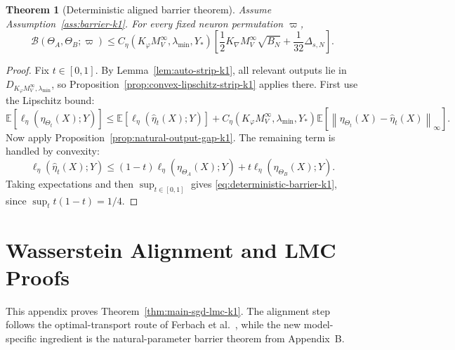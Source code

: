 \documentclass[11pt]{article}
\newtheorem{theorem}{Theorem}
\theoremstyle{definition}
\newcommand{\E}{\mathbb{E}}
\newcommand{\norm}[1]{\left\lVert #1 \right\rVert}
\newcommand{\cB}{\mathcal{B}}
\begin{document}
\begin{theorem}[Deterministic aligned barrier theorem]
\label{thm:deterministic-lmc-k1}
Assume Assumption~\ref{ass:barrier-k1}. For every fixed neuron permutation
$\varpi$,
\begin{equation}
  \cB(\Theta_A,\Theta_B;\varpi)
  \le
  C_\eta(K_\varphi M_V^\infty,\lambda_{\min},Y_\ast)
  \left[
    \frac12 K_{\nabla}M_V^\infty\sqrt{B_N}
    +
    \frac1{32}\Delta_{s,N}
  \right].
  \label{eq:deterministic-barrier-k1}
\end{equation}
\end{theorem}

\begin{proof}
Fix $t\in[0,1]$. By Lemma~\ref{lem:auto-strip-k1}, all relevant outputs lie in
$D_{K_\varphi M_V^\infty,\lambda_{\min}}$, so
Proposition~\ref{prop:convex-lipschitz-strip-k1} applies there. First use the
Lipschitz bound:
\[
  \E[\ell_\eta(\eta_{\Theta_t}(X);Y)]
  \le
  \E[\ell_\eta(\hat\eta_t(X);Y)]
  +
  C_\eta(K_\varphi M_V^\infty,\lambda_{\min},Y_\ast)
  \E[\norm{\eta_{\Theta_t}(X)-\hat\eta_t(X)}_\infty].
\]
Now apply Proposition~\ref{prop:natural-output-gap-k1}. The remaining term is
handled by convexity:
\[
  \ell_\eta(\hat\eta_t(X);Y)
  \le
  (1-t)\ell_\eta(\eta_{\Theta_A}(X);Y)
  +
  t\ell_\eta(\eta_{\Theta_B}(X);Y).
\]
Taking expectations and then $\sup_{t\in[0,1]}$ gives
\eqref{eq:deterministic-barrier-k1}, since $\sup_t t(1-t)=1/4$.
\end{proof}

\section{Wasserstein Alignment and LMC Proofs}

This appendix proves Theorem~\ref{thm:main-sgd-lmc-k1}. The alignment step
follows the optimal-transport route of Ferbach et al.~\cite{Ferbach2024}, while
the new model-specific ingredient is the natural-parameter barrier theorem from
Appendix~B.
\end{document}
